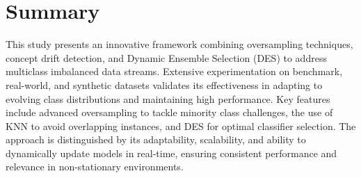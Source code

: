 \section{Summary}
\label{sec:4_summary}
This study presents an innovative framework combining oversampling techniques, concept drift detection, and Dynamic Ensemble Selection (DES) to address multiclass imbalanced data streams. Extensive experimentation on benchmark, real-world, and synthetic datasets validates its effectiveness in adapting to evolving class distributions and maintaining high performance. Key features include advanced oversampling to tackle minority class challenges, the use of KNN to avoid overlapping instances, and DES for optimal classifier selection. The approach is distinguished by its adaptability, scalability, and ability to dynamically update models in real-time, ensuring consistent performance and relevance in non-stationary environments.